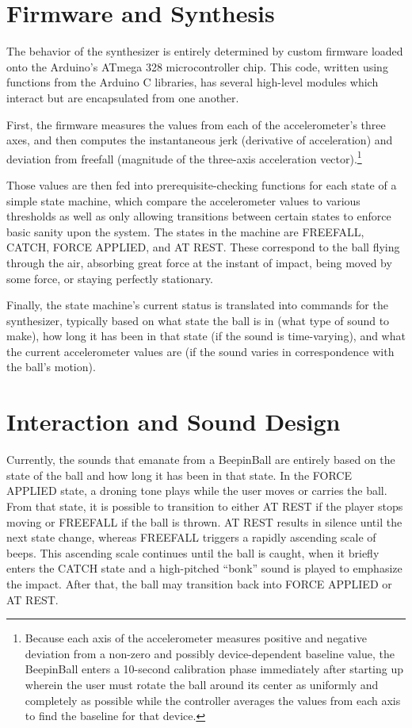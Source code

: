 \documentclass{nime-alternate}
\begin{document}
\section{Firmware and Synthesis}

The behavior of the synthesizer is entirely determined by custom firmware 
loaded onto the Arduino's ATmega 328 microcontroller chip. This code, written
using functions from the Arduino C libraries, has several high-level modules 
which interact but are encapsulated from one another. 

First, the firmware measures the values from each of the accelerometer's three axes,
and then computes the instantaneous jerk (derivative of acceleration) and deviation 
from freefall (magnitude of the three-axis acceleration vector).\footnote{Because 
each axis of the accelerometer measures positive 
and negative deviation from a non-zero and possibly device-dependent baseline
value, the BeepinBall enters a 10-second calibration phase immediately after
starting up wherein the user must rotate the ball around its center as 
uniformly and completely as possible while the controller averages the 
values from each axis to find the baseline for that device.} 

Those values are then fed into prerequisite-checking functions for each state 
of a simple state machine, which compare the accelerometer values to various 
thresholds as well as only allowing transitions between certain states to enforce
basic sanity upon the system. The states in the machine are FREEFALL, CATCH, 
FORCE APPLIED, and AT REST. These correspond to the ball flying through the 
air, absorbing great force at the instant of impact, being moved by some 
force, or staying perfectly stationary. 

Finally, the state machine's current status is translated into commands 
for the synthesizer, typically based on what state the ball is in (what type 
of sound to make), how long it has been in that state (if the sound is 
time-varying), and what the current accelerometer values are (if the sound 
varies in correspondence with the ball's motion).

\section{Interaction and Sound Design}

Currently, the sounds that emanate from a BeepinBall are entirely based on the state
of the ball and how long it has been in that state. In the FORCE APPLIED state, 
a droning tone plays while the user moves or carries the ball. From that state, it is
possible to transition to either AT REST if the player stops moving or FREEFALL if the
ball is thrown. AT REST results in silence until the next state change, whereas FREEFALL
triggers a rapidly ascending scale of beeps. This ascending scale continues until the ball 
is caught, when it briefly enters the CATCH state and a high-pitched ``bonk'' sound 
is played to emphasize the impact. After that, the ball may transition back into FORCE APPLIED
or AT REST.
\end{document}
